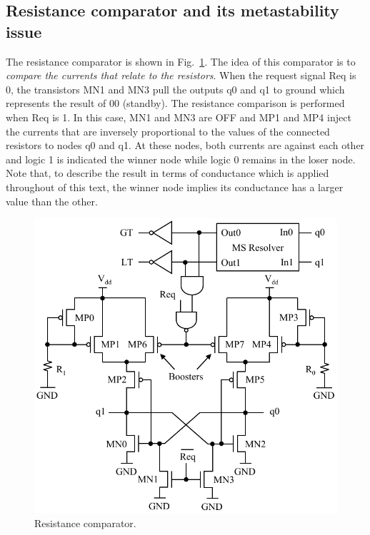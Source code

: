 \documentclass[twocolumn,conference]{IEEEtran}
\begin{document}
\subsection{Resistance comparator and its metastability issue}
\label{subsec:ResistanceComparatorAndItsMetastabilityIssue}
The resistance comparator is shown in Fig.~\ref{fig:ComparatorWithBooster}. The idea of this comparator is to \textit{compare the currents that relate to the resistors}. 
When the request signal Req is 0, the transistors MN1 and MN3 pull the outputs q0 and q1 to ground which represents the result of 00 (standby). The resistance comparison is performed when Req is 1. In this case, MN1 and MN3 are OFF and MP1 and MP4 inject the currents that are inversely proportional to the values of the connected resistors to nodes q0 and q1. At these nodes, both currents are against each other and logic 1 is indicated the winner node while logic 0 remains in the loser node. Note that, to describe the result in terms of conductance which is applied throughout of this text, the winner node implies its conductance has a larger value than the other.
\begin{figure}[ht]
    \centering
    \includegraphics[scale=0.6]{figs/ComparatorWithBoosterV4}
    \caption{Resistance comparator.}
    \label{fig:ComparatorWithBooster}
\end{figure}
\end{document}
